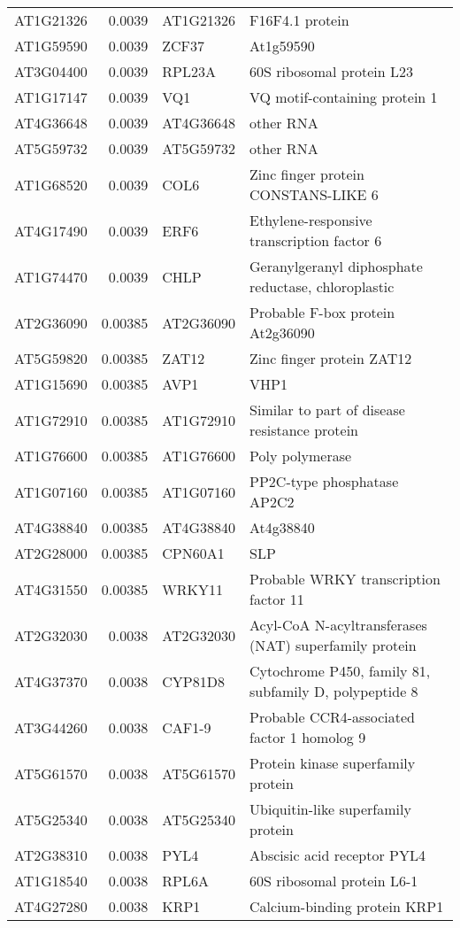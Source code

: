 \documentclass[a4paper]{article}
\begin{document}
\begin{center}
\begin{tabular}{lrll}
AT1G21326 & 0.0039 & AT1G21326 & F16F4.1 protein\\
AT1G59590 & 0.0039 & ZCF37 & At1g59590\\
AT3G04400 & 0.0039 & RPL23A & 60S ribosomal protein L23\\
AT1G17147 & 0.0039 & VQ1 & VQ motif-containing protein 1\\
AT4G36648 & 0.0039 & AT4G36648 & other RNA\\
AT5G59732 & 0.0039 & AT5G59732 & other RNA\\
AT1G68520 & 0.0039 & COL6 & Zinc finger protein CONSTANS-LIKE 6\\
AT4G17490 & 0.0039 & ERF6 & Ethylene-responsive transcription factor 6\\
AT1G74470 & 0.0039 & CHLP & Geranylgeranyl diphosphate reductase, chloroplastic\\
AT2G36090 & 0.00385 & AT2G36090 & Probable F-box protein At2g36090\\
AT5G59820 & 0.00385 & ZAT12 & Zinc finger protein ZAT12\\
AT1G15690 & 0.00385 & AVP1 & VHP1\\
AT1G72910 & 0.00385 & AT1G72910 & Similar to part of disease resistance protein\\
AT1G76600 & 0.00385 & AT1G76600 & Poly polymerase\\
AT1G07160 & 0.00385 & AT1G07160 & PP2C-type phosphatase AP2C2\\
AT4G38840 & 0.00385 & AT4G38840 & At4g38840\\
AT2G28000 & 0.00385 & CPN60A1 & SLP\\
AT4G31550 & 0.00385 & WRKY11 & Probable WRKY transcription factor 11\\
AT2G32030 & 0.0038 & AT2G32030 & Acyl-CoA N-acyltransferases (NAT) superfamily protein\\
AT4G37370 & 0.0038 & CYP81D8 & Cytochrome P450, family 81, subfamily D, polypeptide 8\\
AT3G44260 & 0.0038 & CAF1-9 & Probable CCR4-associated factor 1 homolog 9\\
AT5G61570 & 0.0038 & AT5G61570 & Protein kinase superfamily protein\\
AT5G25340 & 0.0038 & AT5G25340 & Ubiquitin-like superfamily protein\\
AT2G38310 & 0.0038 & PYL4 & Abscisic acid receptor PYL4\\
AT1G18540 & 0.0038 & RPL6A & 60S ribosomal protein L6-1\\
AT4G27280 & 0.0038 & KRP1 & Calcium-binding protein KRP1\\

\end{tabular}
\end{center}
\end{document}
